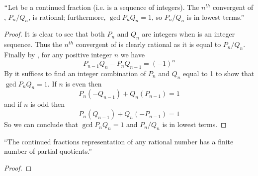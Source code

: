         \begin{corollary}
            $``$Let  be a continued fraction (i.e.
             is a sequence of integers). The $n^{th}$
            convergent of , $P_n / Q_n$, is rational;
            furthermore, $\gcd{P_n}{Q_n} = 1$, so $P_n / Q_n$ is in lowest
            terms.''
        \end{corollary}
        \begin{proof}
            It is clear to see that both $P_n$ and $Q_n$ are integers when
             is an integer sequence. Thus the $n^{th}$
            convergent of  is clearly rational as it is equal
            to $P_n / Q_n$. Finally by ,
            for any positive integer $n$ we have
            \begin{equation}
                \label{Cont. Frac. GCD Eq 1}
                P_{n - 1} Q_n - P_n Q_{n - 1} = (-1)^n
            \end{equation}
            By  it suffices to find
            an integer combination of $P_n$ and $Q_n$ equal to 1 to show that
            $\gcd{P_n}{Q_n} = 1$. If $n$ is even then
            \begin{equation}
                P_n (-Q_{n - 1}) + Q_n (P_{n - 1}) = 1
            \end{equation}
            and if $n$ is odd then
            \begin{equation}
                P_{n} (Q_{n - 1}) + Q_n(-P_{n - 1}) = 1
            \end{equation}
            So we can conclude that $\gcd{P_n}{Q_n} = 1$ and $P_n / Q_n$ is in
            lowest terms. \QED
        \end{proof}
        \begin{theorem}
            ``The continued fractions representation of any rational number has a finite number
              of partial quotients.''
        \end{theorem}
        \begin{proof}
        \end{proof}
